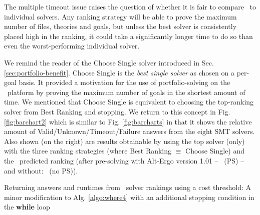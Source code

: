 The multiple timeout issue raises the question of whether it is fair to compare \where~to individual solvers. 
Any ranking strategy will be able to prove the maximum number of files, theories and goals, but unless the best solver is consistently placed high in the ranking, it could take a significantly longer time to do so than even the worst-performing individual solver.   

We remind the reader of the \textsf{Choose Single} solver introduced in Sec. \ref{sec:portfolio-benefit}.
\textsf{Choose Single} is the \textit{best single solver} as chosen on a per-goal basis.
It provided a motivation for the use of portfolio-solving on the \why~platform by proving the maximum number of goals in the shortest amount of time.
We mentioned that \textsf{Choose Single} is equivalent to choosing  the top-ranking solver from \textsf{Best Ranking} and stopping.
We return to this concept in Fig. \ref{fig:barchart2} which is similar to Fig. \ref{fig:barcharts} in that it shows the relative amount of Valid/Unknown/Timeout/Failure answers from the eight SMT solvers. 
Also shown (on the right) are results obtainable by using the top solver (only) with the three ranking strategies (where \textsf{Best Ranking} $\equiv$ \textsf{Choose Single}) and the \where~predicted ranking (after pre-solving with Alt-Ergo version 1.01 -- \where~(PS) -- and without: \where~(no PS)).


\begin{algorithm}
	\caption{Returning answers and runtimes from \where~solver rankings using a cost threshold: A minor modification to Alg. \ref{algo:where4} with an additional stopping condition in the \textbf{while} loop}
	\label{algo:threshold}
	
\end{algorithm}


